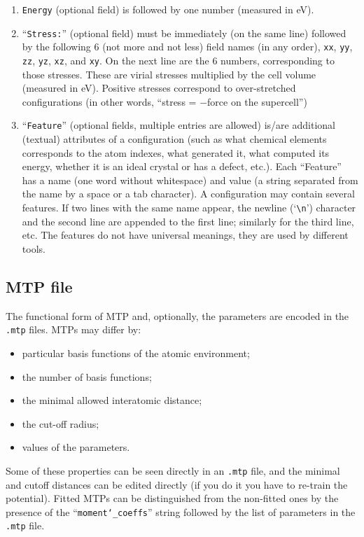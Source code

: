 \documentclass[12pt]{article}
\renewcommand{\_}{\char`_}
\begin{document}
\begin{enumerate}
	\item \texttt{Energy} (optional field) is followed by one number (measured in eV). 
	
	\item ``\texttt{Stress:}'' (optional field) must be immediately (on the same line) followed by the following 6 (not more and not less) field names (in any order), \texttt{xx}, \texttt{yy}, \texttt{zz}, \texttt{yz}, \texttt{xz}, and \texttt{xy}.
	On the next line are the 6 numbers, corresponding to those stresses.
	These are virial stresses multiplied by the cell volume (measured in eV).
	Positive stresses correspond to over-stretched configurations (in other words, ``stress = $-$force on the supercell'')
	
	\item ``\texttt{Feature}'' (optional fields, multiple entries are allowed) is/are additional (textual) attributes of a configuration (such as what chemical elements corresponds to the atom indexes, what generated it, what computed its energy, whether it is an ideal crystal or has a defect, etc.). Each ``Feature'' has a name (one word without whitespace) and value (a string separated from the name by a space or a tab character). A configuration may contain several features. 
	If two lines with the same name appear, the newline (`\texttt{\textbackslash n}') character and the second line are appended to the first line; similarly for the third line, etc.
	The features do not have universal meanings, they are used by different tools.
\end{enumerate}


\subsection{MTP file}\label{MTPfile}

The functional form of MTP and, optionally, the parameters are encoded in the \texttt{.mtp} files.
MTPs may differ by:
\begin{itemize}
	\item particular basis functions of the atomic environment;
	\item the number of basis functions;
	\item the minimal allowed interatomic distance;
	\item the cut-off radius;
	\item values of the parameters.
\end{itemize}
Some of these properties can be seen directly in an \texttt{.mtp} file, and the minimal and cutoff distances can be edited directly (if you do it you have to re-train the potential).
Fitted MTPs can be distinguished from the non-fitted ones by the presence of the ``\texttt{moment\_coeffs}'' string followed by the list of parameters in the \texttt{.mtp} file.
\end{document}
